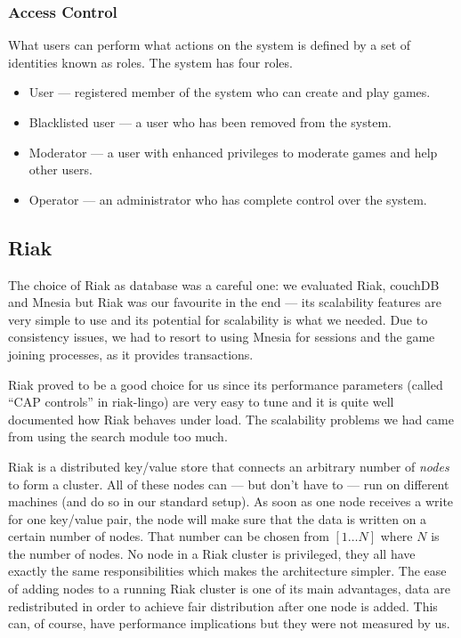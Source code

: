 \documentclass[11pt,a4paper]{report}
\begin{document}
\subsubsection{Access Control}
What users can perform what actions on the system is defined by a set of
identities known as roles. The system has four roles.

\begin{itemize}
\item User --- registered member of the system who can create and play games.
\item Blacklisted user --- a user who has been removed from the system.
\item Moderator --- a user with enhanced privileges to moderate games and help
other users.
\item Operator --- an administrator who has complete control over the system.

\end{itemize}


\subsection{Riak}
\label{sec:riak}
The choice of Riak as database was a careful one: we evaluated Riak, couchDB
and Mnesia but Riak was our favourite in the end --- its scalability features
are very simple to use and its potential for scalability is what we needed.
Due to consistency issues, we had to resort to using Mnesia for sessions and
the game joining processes, as it provides transactions.

Riak proved to be a good choice for us since its performance parameters (called
``CAP controls''\cite{cap_controls} in riak-lingo) are very easy to tune and it
is quite well documented how Riak behaves under load. The scalability problems
we had came from using the search module too much.

Riak is a distributed key/value store that connects an arbitrary number of
{\em nodes} to form a cluster. All of these nodes can --- but don't have to ---
run on different machines (and do so in our standard setup). As soon as one
node receives a write for one key/value pair, the node will make sure that the
data is written on a certain number of nodes. That number can be chosen from
$[1 \ldots N]$ where $N$ is the number of nodes.
No node in a Riak cluster is privileged, they all have exactly the same
responsibilities which makes the architecture simpler.
The ease of adding nodes to a running Riak cluster is one of its main
advantages, data are redistributed in order to achieve fair distribution after
one node is added. This can, of course, have performance implications but they
were not measured by us.
\end{document}

